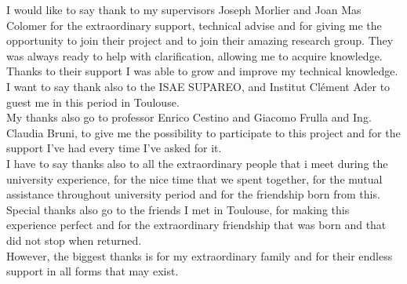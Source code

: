 I would like to say thank to my supervisors Joseph Morlier and Joan Mas Colomer for the extraordinary support, technical advise and for giving me the opportunity to join their project and to join their amazing research group. They was always ready to help with clarification, allowing me to acquire knowledge. Thanks to their support I was able to grow and improve my technical knowledge. I want to say thank also to the ISAE SUPAREO, and Institut Clément Ader to guest me in this period in Toulouse.\\
My thanks also go to professor Enrico Cestino and Giacomo Frulla and Ing. Claudia Bruni, to give me the possibility to participate to this project and for the support I've had every time I've asked for it.\\
I have to say thanks also to all the extraordinary people that i meet during the university experience, for the nice time that we spent together, for the mutual assistance throughout university period and for the friendship born from this.\\
Special thanks also go to the friends I met in Toulouse, for making this experience perfect and  for the extraordinary friendship that was born and that did not stop when returned.\\
However, the biggest thanks is for my extraordinary family and for their endless support in all forms that may exist.